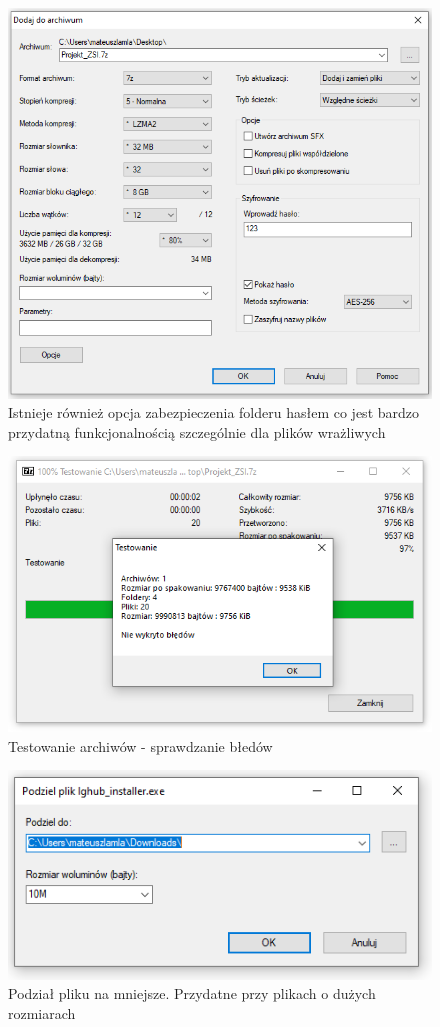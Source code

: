 \documentclass[0.82pt,a4paper]{article}
\begin{document}
    \begin{figure}[H]
        \centering
        \includegraphics[width=0.8\linewidth]{media/7zip/6_mozliwosc_dodawania_hasla_do_archiwum.PNG}
        \caption[]{Istnieje również opcja zabezpieczenia folderu hasłem co jest bardzo przydatną funkcjonalnością szczególnie dla plików wrażliwych}
        \label{fig:7z_zabezpieczenie_haslem}
    \end{figure}

    \begin{figure}[H]
        \centering
        \includegraphics[width=0.8\linewidth]{media/7zip/7_testowanie_archiwow.PNG}
        \caption[]{Testowanie archiwów - sprawdzanie błedów}
        \label{fig:7z_testowanie_archiwow}
    \end{figure}

    \begin{figure}[H]
        \centering
        \includegraphics[width=0.8\linewidth]{media/7zip/8_dzielenie_plikow_na_mniejsze.PNG}
        \caption[]{Podział pliku na mniejsze. Przydatne przy plikach o dużych rozmiarach}
        \label{fig:7z_podzial_plik}
    \end{figure}
\end{document}
